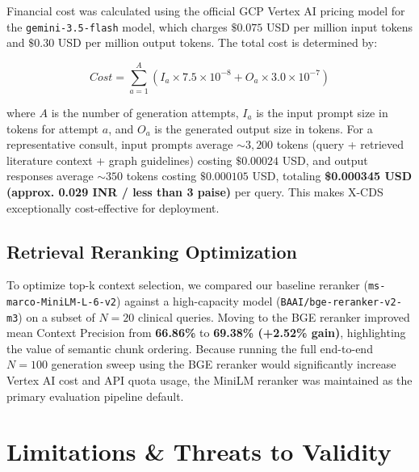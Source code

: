 \documentclass[sn-mathphys,Numbered]{sn-jnl}%
\begin{document}
Financial cost was calculated using the official GCP Vertex AI pricing model for the \texttt{gemini-3.5-flash} model, which charges $\$0.075$ USD per million input tokens and $\$0.30$ USD per million output tokens. The total cost is determined by:

\begin{equation}
Cost = \sum_{a=1}^{A} \left( I_a \times 7.5 \times 10^{-8} + O_a \times 3.0 \times 10^{-7} \right)
\end{equation}

where $A$ is the number of generation attempts, $I_a$ is the input prompt size in tokens for attempt $a$, and $O_a$ is the generated output size in tokens. For a representative consult, input prompts average $\sim3,200$ tokens (query + retrieved literature context + graph guidelines) costing $\$0.00024$ USD, and output responses average $\sim350$ tokens costing $\$0.000105$ USD, totaling \textbf{\$0.000345 USD (approx. 0.029 INR / less than 3 paise)} per query. This makes X-CDS exceptionally cost-effective for deployment.

\subsection{Retrieval Reranking Optimization}
To optimize top-k context selection, we compared our baseline reranker (\texttt{ms-marco-MiniLM-L-6-v2}) against a high-capacity model (\texttt{BAAI/bge-reranker-v2-m3}) on a subset of $N=20$ clinical queries. Moving to the BGE reranker improved mean Context Precision from \textbf{66.86\%} to \textbf{69.38\% (+2.52\% gain)}, highlighting the value of semantic chunk ordering. Because running the full end-to-end $N=100$ generation sweep using the BGE reranker would significantly increase Vertex AI cost and API quota usage, the MiniLM reranker was maintained as the primary evaluation pipeline default.

\section{Limitations \& Threats to Validity}\label{sec5}
\end{document}
